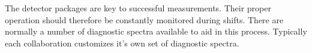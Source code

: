 {The detector packages are key to successful measurements.  Their
proper operation should therefore be constantly monitored during
shifts. There are normally a number of diagnostic spectra available to
aid in this process.  Typically each collaboration customizes it's own
set of diagnostic spectra.
} %
